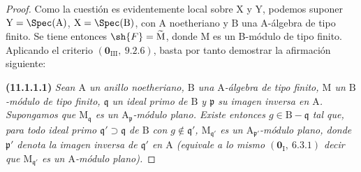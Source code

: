 \begin{proof}
Como la cuestión es evidentemente local sobre $\mathrm{X}$ y $\mathrm{Y}$, podemos suponer $\mathrm{Y}=\Spec(\mathrm{A})$, $\mathrm{X}=\Spec(\mathrm{B})$, con $\mathrm{A}$ noetheriano y $\mathrm{B}$ una A-álgebra de tipo finito. Se tiene entonces $\sh{F}=\widetilde{\mathrm{M}}$, donde $\mathrm{M}$ es un B-módulo de tipo finito. Aplicando el criterio $(\mathbf{0}_{\mathrm{III}},~9.2.6)$, basta por tanto demostrar la afirmación siguiente:

\medskip
{}\label{IV.11.1.1.1}
\noindent\textbf{(11.1.1.1)}
\emph{Sean $\mathrm{A}$ un anillo noetheriano, $\mathrm{B}$ una $\mathrm{A}$-álgebra de tipo finito, $\mathrm{M}$ un $\mathrm{B}$-módulo de tipo finito, $\mathfrak{q}$ un ideal primo de $\mathrm{B}$ y $\mathfrak{p}$ su imagen inversa en $\mathrm{A}$. Supongamos que $\mathrm{M}_\mathfrak{q}$ es un $\mathrm{A}_\mathfrak{p}$-módulo plano. Existe entonces $g\in\mathrm{B}-\mathfrak{q}$ tal que, para todo ideal primo $\mathfrak{q}'\supset\mathfrak{q}$ de $\mathrm{B}$ con $g\notin\mathfrak{q}'$, $\mathrm{M}_{\mathfrak{q}'}$ es un $\mathrm{A}_{\mathfrak{p}'}$-módulo plano, donde $\mathfrak{p}'$ denota la imagen inversa de $\mathfrak{q}'$ en $\mathrm{A}$ (equivale a lo mismo $(\mathbf{0}_\mathrm{I},~6.3.1)$ decir que $\mathrm{M}_{\mathfrak{q}'}$ es un $\mathrm{A}$-módulo plano).}
\medskip


\end{proof}
